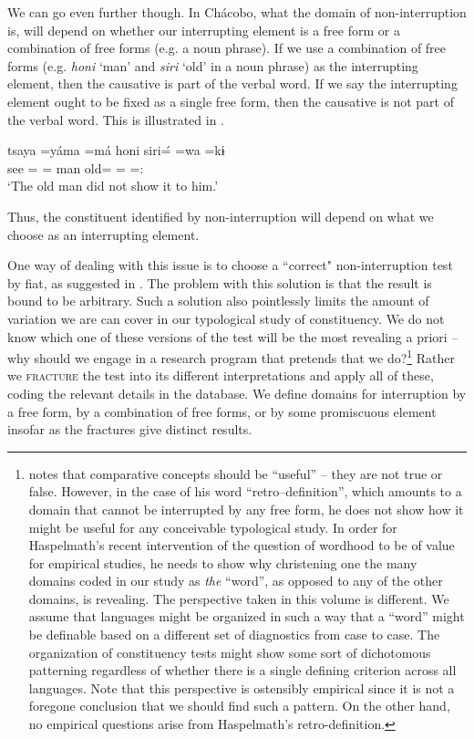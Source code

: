 \documentclass[output=paper,hidelinks]{langscibook}
\begin{document}
We can go even further though. In Chácobo, what the domain of non-inter\-rup\-tion is, will depend on whether our interrupting element is a free form or a combination of free forms (e.g. a noun phrase). If we use a combination of free forms (e.g. \textit{honi} `man' and \textit{siri} `old' in a noun phrase) as the interrupting element, then the causative is part of the verbal word. If we say the interrupting element ought to be fixed as a single free form, then the causative is not part of the verbal word. This is illustrated in  \citep{tallman2021constituency}.

\ea \label{ref:chacobointerruption}
    \gll tsaya =yáma =má honi siri=́  =wa =kɨ \\
    see =\Neg{} =\Caus{} man old=\Erg{} =\Tr{} =\Decl{}:\Pst{} \\
    \glt `The old man did not show it to him.'
\z 

Thus, the constituent identified by non-interruption will depend on what we choose as an interrupting element.

One way of dealing with this issue is to choose a ``correct" non-interruption test by fiat, as suggested in \citet{haspelmathword:2011, haspelmath2022defining}. The problem with this solution is that the result is bound to be arbitrary. Such a solution also pointlessly limits the amount of variation we are can cover in our typological study of constituency. We do not know which one of these versions of the test will be the most revealing a priori -- why should we engage in a research program that pretends that we do?\footnote{\citet{haspelmath2010comparative} notes that comparative concepts should be ``useful'' -- they are not true or false. However, in the case of his word ``retro--definition'', which amounts to a domain that cannot be interrupted by any free form, he does not show how it might be useful for any conceivable typological study. In order for Haspelmath's recent intervention of the question of wordhood to be of value for empirical studies, he needs to show why christening one the many domains coded in our study as \textit{the} ``word'', as opposed to any of the other domains, is revealing. The perspective taken in this volume is different. We assume that languages might be organized in such a way that a ``word'' might be definable based on a different set of diagnostics from case to case. The organization of constituency tests might show some sort of dichotomous patterning regardless of whether there is a single defining criterion across all languages. Note that this perspective is ostensibly empirical since it is not a foregone conclusion that we should find such a pattern. On the other hand, no empirical questions arise from Haspelmath's retro-definition.} Rather we \textsc{fracture} the test into its different interpretations and apply all of these, coding the relevant details in the database. We define domains for interruption by a free form, by a combination of free forms, or by some promiscuous element insofar as the fractures give distinct results.
\end{document}
